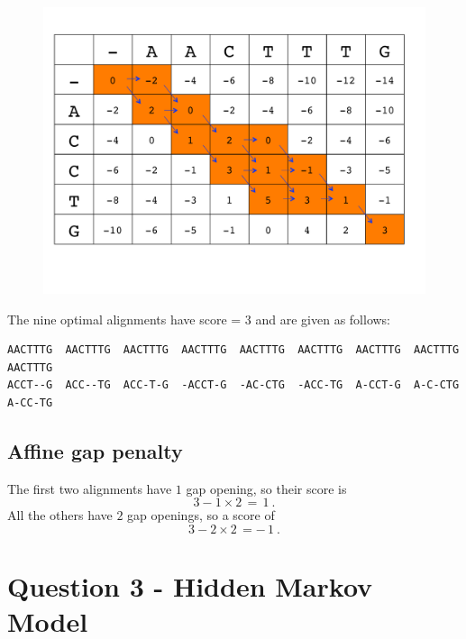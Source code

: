 \documentclass[a4paper,11pt]{article}
\begin{document}
\begin{figure}[h]
\centering\includegraphics[scale=.4]{scoring_matrix.pdf}
\end{figure}

\noindent The nine optimal alignments have score = 3 and are given as follows:

\begin{verbatim}
AACTTTG  AACTTTG  AACTTTG  AACTTTG  AACTTTG  AACTTTG  AACTTTG  AACTTTG  AACTTTG
ACCT--G  ACC--TG  ACC-T-G  -ACCT-G  -AC-CTG  -ACC-TG  A-CCT-G  A-C-CTG  A-CC-TG

\end{verbatim}

\subsection*{Affine gap penalty}

The first two alignments have $1$ gap opening, so their score is 
$$
3 - 1 \times 2 \,=\, 1~.
$$
All the others have $2$ gap openings, so a score of
$$
3-2\times 2\,=-\,1~.
$$

\section*{Question 3 - Hidden Markov Model}
\end{document}
